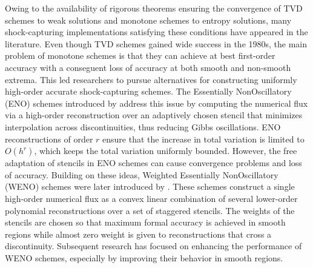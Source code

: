 \documentclass[a5paper]{sapthesis}
\begin{document}
	\noindent Owing to the availability of rigorous theorems ensuring the convergence of TVD schemes to weak solutions and monotone schemes to entropy solutions, many shock-capturing implementations satisfying these conditions have appeared in the literature. Even though TVD schemes gained wide success in the 1980s, the main problem of monotone schemes is that they can achieve at best first-order accuracy with a conseguent loss of accuracy at both smooth and non-smooth extrema. This led researchers to pursue alternatives for constructing uniformly high-order accurate shock-capturing schemes. 
	The Essentially NonOscillatory (ENO) schemes introduced by  \citet{HARTEN1983} address this issue by computing the numerical flux via a high-order reconstruction over an adaptively chosen stencil that minimizes interpolation across discontinuities, thus reducing Gibbs oscillations. ENO reconstructions of order $r$ ensure that the increase in total variation is limited to $O(h^r)$, which keeps the total variation uniformly bounded. However, the free adaptation of stencils in ENO schemes can cause convergence problems and loss of accuracy. Building on these ideas, Weighted Essentially NonOscillatory (WENO) schemes were later introduced by \citet{LIU1994}. These schemes construct a single high-order numerical flux as a convex linear combination of several lower-order polynomial reconstructions over a set of staggered stencils. The weights of the stencils are chosen so that maximum formal accuracy is achieved in smooth regions while almost zero weight is given to reconstructions that cross a discontinuity. Subsequent research has focused on enhancing the performance of WENO schemes, especially by improving their behavior in smooth regions. 
	
\end{document}
